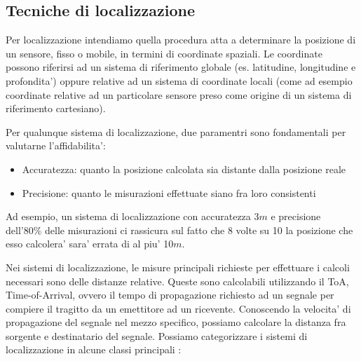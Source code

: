 \documentclass[Lau,binding=0.6cm]{sapthesis}
\begin{document}
\subsection{Tecniche di localizzazione}
Per localizzazione intendiamo quella procedura atta a determinare la posizione di un sensore, fisso o mobile, in termini di coordinate spaziali. Le coordinate possono riferirsi ad un sistema di riferimento globale (es. latitudine, longitudine e profondita') oppure relative ad un sistema di coordinate locali (come ad esempio coordinate relative ad un particolare sensore preso come origine di un sistema di riferimento cartesiano).
\par
Per qualunque sistema di localizzazione, due paramentri sono fondamentali per valutarne l'affidabilita':
\begin{itemize}
    \item Accuratezza: quanto la posizione calcolata sia distante dalla posizione reale
    \item Precisione: quanto le misurazioni effettuate siano fra loro consistenti
\end{itemize}
Ad esempio, un sistema di localizzazione con accuratezza 3$m$  e precisione dell'80\% delle misurazioni ci rassicura sul fatto che 8 volte su 10 la posizione che esso calcolera' sara' errata di al piu' 10$m$.
\par
Nei sistemi di localizzazione, le misure principali richieste per effettuare i calcoli necessari sono delle distanze relative. Queste sono calcolabili utilizzando il ToA, Time-of-Arrival, ovvero il tempo di propagazione richiesto ad un segnale per compiere il tragitto da un emettitore ad un ricevente. Conoscendo la velocita' di propagazione del segnale nel mezzo specifico, possiamo calcolare la distanza fra sorgente e destinatario del segnale.
Possiamo categorizzare i sistemi di localizzazione in alcune classi principali \cite{trilateration}:
\end{document}
